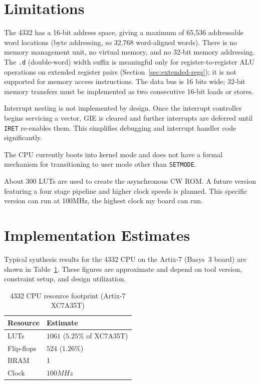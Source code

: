 \documentclass[a4paper,12pt]{report}
\newcommand{\asm}[1]{\texttt{#1}}
\begin{document}
\section{Limitations}

The 4332 has a 16-bit address space, giving a maximum of 65,536 addressable word locations (byte addressing, so 32,768 word-aligned words). There is no memory management unit, no virtual memory, and no 32-bit memory addressing. The \asm{.d} (double-word) width suffix is meaningful only for register-to-register ALU operations on extended register pairs (Section~\ref{sec:extended-regs}); it is not supported for memory access instructions. The data bus is 16 bits wide; 32-bit memory transfers must be implemented as two consecutive 16-bit loads or stores.

Interrupt nesting is not implemented by design. Once the interrupt controller begins servicing a vector, GIE is cleared and further interrupts are deferred until \asm{IRET} re-enables them. This simplifies debugging and interrupt handler code significantly.

The CPU currently boots into kernel mode and does not have a formal mechanism for transitioning to user mode other than \asm{SETMODE}.

About 300 LUTs are used to create the asynchronous CW ROM. A future version featuring a four stage pipeline and higher clock speeds is planned.
This specific version can run at 100MHz, the highest clock my board can run.

\section{Implementation Estimates}

Typical synthesis results for the 4332 CPU on the Artix-7 (Basys~3 board) are shown in Table~\ref{tab:implementation}. These figures are approximate and depend on tool version, constraint setup, and design utilization.

\begin{table}[htbp]
\centering
\caption{4332 CPU resource footprint (Artix-7 XC7A35T)}
\label{tab:implementation}
\begin{tabularx}{\textwidth}{lX}
    \toprule
    \textbf{Resource} & \textbf{Estimate} \\
    \midrule
    LUTs         & $1061$ ($5.25\%$ of XC7A35T) \\
    Flip-flops   & $524$ ($1.26\%$) \\
    BRAM         & 1 \\
    Clock        & $100MHz$
    \bottomrule
\end{tabularx}
\end{table}
\end{document}
